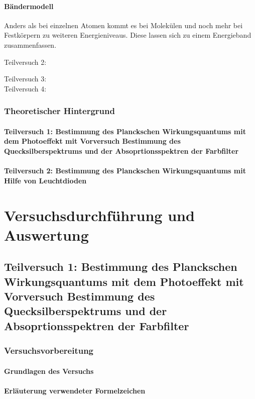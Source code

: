 \documentclass[12pt,oneside,oldfontcommands]{memoir}
\begin{document}
\paragraph{Bändermodell}
Anders als bei einzelnen Atomen kommt es bei Molekülen und noch mehr bei Festkörpern zu weiteren Energieniveaus. Diese lassen sich zu einem Energieband zusammenfassen.



Teilversuch 2:


Teilversuch 3:\\



Teilversuch 4:\\


\subsubsection{Theoretischer Hintergrund}
\paragraph{Teilversuch 1: Bestimmung des Planckschen Wirkungsquantums mit dem Photoeffekt mit Vorversuch Bestimmung des Quecksilberspektrums und der Absoprtionsspektren der Farbfilter}
\paragraph{Teilversuch 2: Bestimmung des Planckschen Wirkungsquantums mit Hilfe von Leuchtdioden}

\section{Versuchsdurchführung und Auswertung}
\subsection{Teilversuch 1: Bestimmung des Planckschen Wirkungsquantums mit dem Photoeffekt mit Vorversuch Bestimmung des Quecksilberspektrums und der Absoprtionsspektren der Farbfilter}
\subsubsection{Versuchsvorbereitung}
\paragraph{Grundlagen des Versuchs}

\paragraph{Erläuterung verwendeter Formelzeichen}
\end{document}
